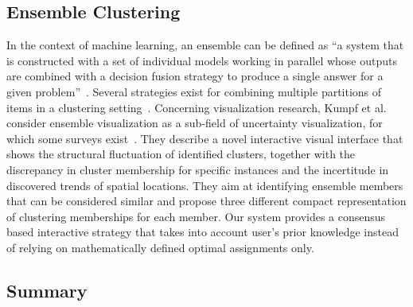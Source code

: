 

\subsection{Ensemble Clustering}

In the context of machine learning, an ensemble can be defined as ``a system that is constructed with a set of individual models working in parallel whose outputs are combined with a decision fusion strategy to produce a single answer for a given problem''~\cite{wangFundamentalIssuesEnsemble2008}. Several strategies exist for combining multiple partitions of items in a clustering setting~\cite{strehl2002cluster}.
Concerning visualization research, Kumpf et al.~\cite{kumpfVisualizingConfidenceClusterBased2018} consider ensemble visualization as a sub-field of uncertainty visualization, for which some surveys exist~\cite{bonneauOverviewStateoftheArtUncertainty2014, maceachrenVisualizingGeospatialInformation2005}. They describe a novel interactive visual interface that shows the structural fluctuation of identified clusters, together with the discrepancy in cluster membership for specific instances and the incertitude in discovered trends of spatial locations.
They aim at identifying ensemble members that can be considered similar and propose three different compact representation of clustering memberships for each member.
Our system provides a consensus based interactive strategy that takes into account user's prior knowledge instead of relying on mathematically defined optimal assignments only.

\subsection{Summary}\label{sec:summary}

